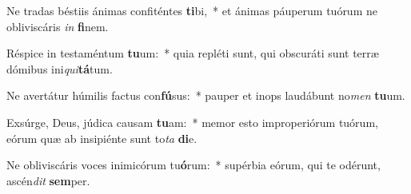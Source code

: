 \item Ne tradas béstiis ánimas confiténtes \textbf{ti}bi,~* et ánimas páuperum tuórum ne obliviscáris \textit{in} \textbf{fi}nem.
\item Réspice in testaméntum \textbf{tu}um:~* quia repléti sunt, qui obscuráti sunt terræ dómibus ini\textit{qui}\textbf{tá}tum.
\item Ne avertátur húmilis factus con\textbf{fú}sus:~* pauper et inops laudábunt no\textit{men} \textbf{tu}um.
\item Exsúrge, Deus, júdica causam \textbf{tu}am:~* memor esto improperiórum tuórum, eórum quæ ab insipiénte sunt to\textit{ta} \textbf{di}e.
\item Ne obliviscáris voces inimicórum tu\textbf{ó}rum:~* supérbia eórum, qui te odérunt, ascén\textit{dit} \textbf{sem}per.
